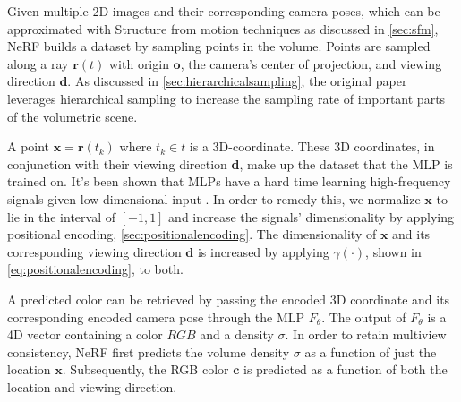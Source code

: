 
Given multiple 2D images and their corresponding camera poses, which can be approximated with Structure from motion techniques as discussed in \autoref{sec:sfm}, NeRF builds a dataset by sampling points in the volume. Points are sampled along a ray $\pmb{r}(t)$ with origin $\textbf{o}$, the camera's center of projection, and viewing direction $\textbf{d}$. As discussed in \autoref{sec:hierarchicalsampling}, the original paper leverages hierarchical sampling to increase the sampling rate of important parts of the volumetric scene.





A point $\pmb{x} = \pmb{r}(t_k)$ where $t_k \in t$ is a 3D-coordinate. These 3D coordinates, in conjunction with their viewing direction \textbf{d}, make up the dataset that the MLP is trained on. It's been shown that MLPs have a hard time learning high-frequency signals given low-dimensional input \cite{tancik_fourier_2020}. In order to remedy this, we normalize $\textbf{x}$ to lie in the interval of $[-1, 1]$ and increase the signals' dimensionality by applying positional encoding, \autoref{sec:positionalencoding}. The dimensionality of $\pmb{x}$ and its corresponding viewing direction $\pmb{d}$ is increased by applying $\gamma(\cdot)$, shown in \autoref{eq:positionalencoding}, to both.



A predicted color can be retrieved by passing the encoded 3D coordinate and its corresponding encoded camera pose through the MLP $F_{\theta}$. The output of $F_\theta$ is a 4D vector containing a color $RGB$ and a density $\sigma$. In order to retain multiview consistency, NeRF first predicts the volume density $\sigma$ as a function of just the location $\textbf{x}$. Subsequently, the RGB color $\pmb{c}$ is predicted as a function of both the location and viewing direction.


